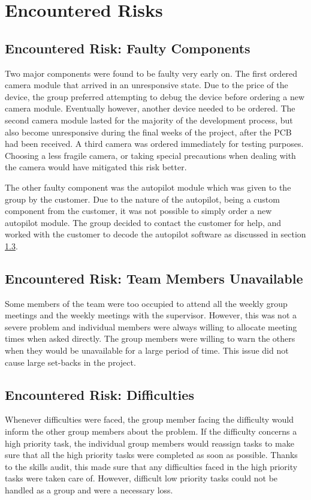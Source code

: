 \section{Encountered Risks}
\label{encountered risks}

\subsection{Encountered Risk: Faulty Components}
Two major components were found to be faulty very early on. 
The first ordered camera module that 
arrived in an unresponsive state. 
Due to the price of the device, 
the group preferred attempting to debug the device before 
ordering a new camera module. 
Eventually however, another device needed to be ordered. 
The second camera module lasted for the majority of 
the development process, but also 
become unresponsive during the final weeks of the project,
after the PCB had been received. 
A third camera was ordered immediately for testing purposes.
Choosing a less fragile camera, or taking special precautions
when dealing with the camera would have mitigated this risk better.

The other faulty component was the autopilot module which 
was given to the group by the customer. 
Due to the nature of the autopilot, being a custom component 
from the customer, it was not possible to simply 
order a new autopilot module. 
The group decided to contact the customer for help, and 
worked with the customer to decode the autopilot software 
as discussed in section \ref{}.

\subsection{Encountered Risk: Team Members Unavailable}
Some members of the team were too occupied to attend 
all the weekly group meetings and 
the weekly meetings with the supervisor. 
However, this was not a severe problem and individual 
members were always willing to allocate 
meeting times when asked directly. 
The group members were willing to warn the others 
when they would be unavailable for a large period of time. 
This issue did not cause large set-backs in the project.

\subsection{Encountered Risk: Difficulties}
Whenever difficulties were faced, the group member 
facing the difficulty would inform the other 
group members about the problem. 
If the difficulty concerns a high priority task, 
the individual group members would reassign 
tasks to make sure that all the high priority 
tasks were completed as soon as possible. 
Thanks to the skills audit, this made sure that 
any difficulties faced in the high priority 
tasks were taken care of. However, difficult low priority
tasks could not be handled as a group
 and were a necessary loss.

